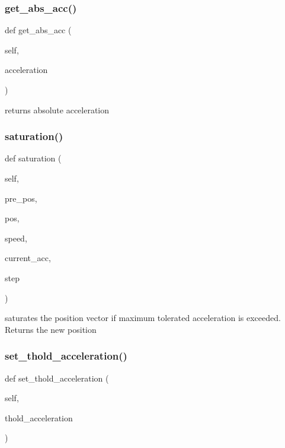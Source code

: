 \subsubsection{\texorpdfstring{get\+\_\+abs\+\_\+acc()}{get\_abs\_acc()}}
{\footnotesize\ttfamily def get\+\_\+abs\+\_\+acc (\begin{DoxyParamCaption}\item[{}]{self,  }\item[{}]{acceleration }\end{DoxyParamCaption})}

\begin{DoxyVerb}returns absolute acceleration\end{DoxyVerb}
 \mbox{\label{class_filter_1_1_filter_aa13f0d1f1966e7f0dc438953a43d7c52}} 
\subsubsection{\texorpdfstring{saturation()}{saturation()}}
{\footnotesize\ttfamily def saturation (\begin{DoxyParamCaption}\item[{}]{self,  }\item[{}]{pre\+\_\+pos,  }\item[{}]{pos,  }\item[{}]{speed,  }\item[{}]{current\+\_\+acc,  }\item[{}]{step }\end{DoxyParamCaption})}

\begin{DoxyVerb}saturates the position vector if maximum tolerated acceleration is exceeded.
Returns the new position\end{DoxyVerb}
 \mbox{\label{class_filter_1_1_filter_ac495c6d2389da8dc58b01a672e6cfd11}} 
\subsubsection{\texorpdfstring{set\+\_\+thold\+\_\+acceleration()}{set\_thold\_acceleration()}}
{\footnotesize\ttfamily def set\+\_\+thold\+\_\+acceleration (\begin{DoxyParamCaption}\item[{}]{self,  }\item[{}]{thold\+\_\+acceleration }\end{DoxyParamCaption})}

